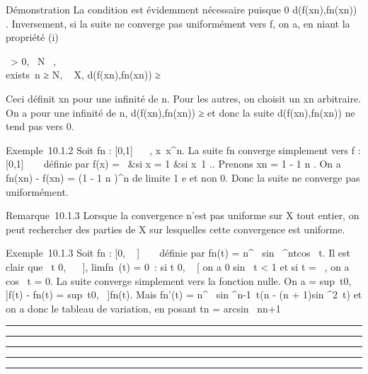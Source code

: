 Démonstration La condition est évidemment nécessaire puisque 0 \leq
d(f(xn),fn(xn)) \leq \mun.
Inversement, si la suite ne converge pas uniformément vers f, on a, en
niant la propriété (i)

\exists~\epsilon \textgreater{} 0,
\forall~N \in {}~, \\exists~n ≥ N,
\existsxn~ \in X,\quad
d(f(xn),fn(xn)) ≥ \epsilon

Ceci définit xn pour une infinité de n. Pour les autres, on
choisit un xn arbitraire. On a pour une infinité de n,
d(f(xn),fn(xn)) ≥ \epsilon et donc la suite
d(f(xn),fn(xn)) ne tend pas vers 0.

Exemple~10.1.2 Soit fn : {[}0,1{]} \rightarrow~ ~,
x\mapsto~x^n. La suite fn
converge simplement vers f : {[}0,1{]} \rightarrow~ ~ définie par f(x) =
\left \ &si x
= 1 &si x\neq~1 
\right .. Prenons xn = 1 - 1
\over n . On a fn(xn) -
f(xn) = (1 - 1 \over n )^n de
limite  1 \over e et non 0. Donc la suite ne converge
pas uniformément.

Remarque~10.1.3 Lorsque la convergence n'est pas uniforme sur X tout
entier, on peut rechercher des parties de X sur lesquelles cette
convergence est uniforme.

Exemple~10.1.3 Soit fn : {[}0, \pi~ {]}
\rightarrow~ ~ définie par fn(t) =
n^\alpha~ sin~
^ntcos~ t. Il est clair que
\forall~t \in {[}0, \pi~~ {]},
limfn~(t) = 0~: si t \in {[}0,
\pi~ {[} on a 0 \leq sin~ t
\textless{} 1 et si t = \pi~, on a cos~ t = 0.
La suite converge simplement vers la fonction nulle. On a \mun
= sup~t\in{[}0,\pi~ {]}\textbar{}f(t) - fn(t)\textbar{}
= sup~t\in{[}0,\pi~ {]}fn(t). Mais fn'(t) =
n^\alpha~ sin ^n-1~t(n - (n +
1)sin ^2~t) et on a donc le tableau
de variation, en posant tn = arcsin~
\sqrt n\over n+1

\begin{center}\rule{3in}{0.4pt}\end{center}

\begin{center}\rule{3in}{0.4pt}\end{center}

\begin{center}\rule{3in}{0.4pt}\end{center}

\begin{center}\rule{3in}{0.4pt}\end{center}

\begin{center}\rule{3in}{0.4pt}\end{center}

